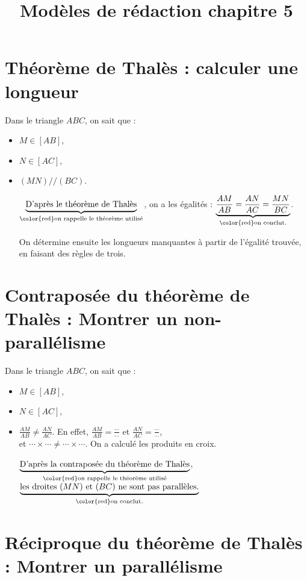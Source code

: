 \documentclass[14 pt, twoside]{extarticle}
\title{Modèles de rédaction chapitre 5}
\date{}
\theoremstyle{plain}
\begin{document}
	\maketitle
	
	
	\section{Théorème de Thalès : calculer une longueur}


Dans le triangle $ABC$, on sait que : 

\begin{itemize}
\item $M\in [AB]$, 
\item $N\in [AC]$, 
\item $(MN)//(BC)$. 

$\underbrace{\text{D'après le théorème de Thalès}}_{\text{\color{red}on rappelle le théorème utilisé}}$, on a les égalités : $\underbrace{\frac{AM}{AB} = \frac{AN}{AC} = \frac{MN}{BC}}_{\text{\color{red}on conclut}.}$. 

{\color{red}On détermine ensuite les longueurs manquantes à partir de l'égalité trouvée, en faisant des règles de trois.}
\end{itemize}

	
		
	\section{Contraposée du théorème de Thalès : Montrer un non-parallélisme}
	
	Dans le triangle $ABC$, on sait que : 

\begin{itemize}
\item $M\in [AB]$, 
\item $N\in [AC]$, 
\item $\displaystyle \frac{AM}{AB}\neq \frac{AN}{AC}$. En effet, 
$\displaystyle\frac{AM}{AB} = \frac\cdots\cdots$ et $\displaystyle\frac{AN}{AC} = \frac\cdots\cdots$, \\et $\cdots \times \cdots \neq \cdots \times \cdots$. {\color{red} On a calculé les produits en croix.}

$\underbrace{\text{D'après la contraposée du théorème de Thalès}}_{\text{\color{red}on rappelle le théorème utilisé}}$,\\
 $\underbrace{\text{les droites $(MN)$ et $(BC)$ ne sont pas parallèles.}}_{\text{\color{red}on conclut}.}$ 

\end{itemize}
\newpage
	
	\section{Réciproque du théorème de Thalès : Montrer un parallélisme}
	
	
	
	
 	
\end{document}
